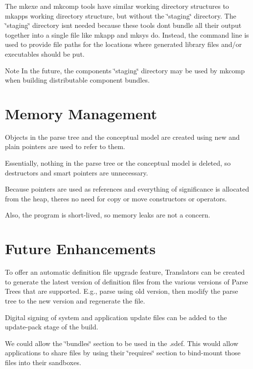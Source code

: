 The mkexe and mkcomp tools have similar working directory structures to mkapp\textquotesingle{}s working directory structure, but without the \char`\"{}staging\char`\"{} directory. The \char`\"{}staging\char`\"{} directory isn\textquotesingle{}t needed because these tools don\textquotesingle{}t bundle all their output together into a single file like mkapp and mksys do. Instead, the command line is used to provide file paths for the locations where generated library files and/or executables should be put.

\begin{DoxyNote}{Note}
In the future, the component\textquotesingle{}s \char`\"{}staging\char`\"{} directory may be used by mkcomp when building distributable component bundles.
\end{DoxyNote}
\hypertarget{mkToolsDesign_mkToolsDesign_MemoryManagement}{}\section{Memory Management}\label{mkToolsDesign_mkToolsDesign_MemoryManagement}
Objects in the parse tree and the conceptual model are created using \textquotesingle{}new\textquotesingle{} and plain pointers are used to refer to them.

Essentially, nothing in the parse tree or the conceptual model is deleted, so destructors and smart pointers are unnecessary.

Because pointers are used as references and everything of significance is allocated from the heap, there\textquotesingle{}s no need for copy or move constructors or operators.

Also, the program is short-\/lived, so memory leaks are not a concern.\hypertarget{mkToolsDesign_mkToolsDesign_FutureEnhancements}{}\section{Future Enhancements}\label{mkToolsDesign_mkToolsDesign_FutureEnhancements}
To offer an automatic definition file upgrade feature, Translators can be created to generate the latest version of definition files from the various versions of Parse Trees that are supported. E.\+g., parse using old version, then modify the parse tree to the new version and regenerate the file.

Digital signing of system and application update files can be added to the update-\/pack stage of the build.

We could allow the \char`\"{}bundles\char`\"{} section to be used in the .sdef. This would allow applications to share files by using their \char`\"{}requires\char`\"{} section to bind-\/mount those files into their sandboxes.

